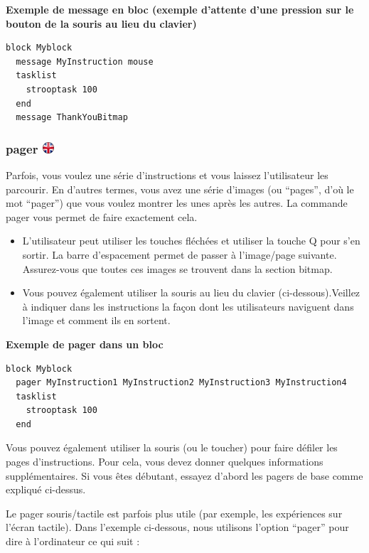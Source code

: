 \documentclass[
]{book}
\providecommand{\tightlist}{%
  \setlength{\itemsep}{0pt}\setlength{\parskip}{0pt}}
\begin{document}
\textbf{Exemple de message en bloc (exemple d'attente d'une pression sur le bouton de la souris au lieu du clavier)}

\begin{verbatim}
block Myblock
  message MyInstruction mouse
  tasklist
    strooptask 100
  end
  message ThankYouBitmap
\end{verbatim}

\hypertarget{pager}{%
\subsubsection[pager ]{\texorpdfstring{pager \href{https://www.psytoolkit.org/doc3.2.0/syntax.html\#block-pager}{\protect\includegraphics{img/ukflag.png}}}{pager }}\label{pager}}

Parfois, vous voulez une série d'instructions et vous laissez l'utilisateur les parcourir. En d'autres termes, vous avez une série d'images (ou ``pages'', d'où le mot ``pager'') que vous voulez montrer les unes après les autres. La commande pager vous permet de faire exactement cela.

\begin{itemize}
\tightlist
\item
  L'utilisateur peut utiliser les touches fléchées et utiliser la touche Q pour s'en sortir. La barre d'espacement permet de passer à l'image/page suivante. Assurez-vous que toutes ces images se trouvent dans la section bitmap.
\item
  Vous pouvez également utiliser la souris au lieu du clavier (ci-dessous).Veillez à indiquer dans les instructions la façon dont les utilisateurs naviguent dans l'image et comment ils en sortent.
\end{itemize}

\textbf{Exemple de pager dans un bloc}

\begin{verbatim}
block Myblock
  pager MyInstruction1 MyInstruction2 MyInstruction3 MyInstruction4
  tasklist
    strooptask 100
  end
\end{verbatim}

Vous pouvez également utiliser la souris (ou le toucher) pour faire défiler les pages d'instructions. Pour cela, vous devez donner quelques informations supplémentaires. Si vous êtes débutant, essayez d'abord les pagers de base comme expliqué ci-dessus.

Le pager souris/tactile est parfois plus utile (par exemple, les expériences sur l'écran tactile). Dans l'exemple ci-dessous, nous utilisons l'option ``pager'' pour dire à l'ordinateur ce qui suit :
\end{document}
